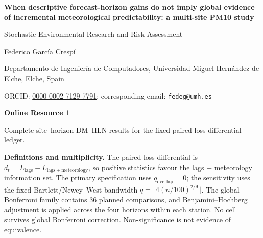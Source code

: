 \documentclass[10pt]{article}
\begin{document}
\begin{center}
{\Large\bfseries When descriptive forecast-horizon gains do not imply global evidence\\[2pt]
of incremental meteorological predictability: a multi-site PM10 study\par}
\vspace{4pt}
{\normalsize Stochastic Environmental Research and Risk Assessment\par}
{\normalsize Federico García Crespí\par}
{\small Departamento de Ingeniería de Computadores, Universidad Miguel Hernández de Elche, Elche, Spain\par}
{\small ORCID: \href{https://orcid.org/0000-0002-7129-7791}{0000-0002-7129-7791}; corresponding email: \texttt{fedeg@umh.es}\par}
\vspace{8pt}
{\Large\bfseries Online Resource 1\par}
\vspace{3pt}
Complete site--horizon DM--HLN results for the fixed paired loss-differential ledger.
\end{center}
\noindent\textbf{Definitions and multiplicity.} The paired loss differential is
$d_t=L_{\mathrm{lags}}-L_{\mathrm{lags+meteorology}}$, so positive statistics favour the lags + meteorology information set.
The primary specification uses $q_{\mathrm{overlap}}=0$; the sensitivity uses the fixed Bartlett/Newey--West bandwidth
$q=\lfloor4(n/100)^{2/9}\rfloor$. The global Bonferroni family contains 36 planned comparisons, and
Benjamini--Hochberg adjustment is applied across the four horizons within each station. No cell survives global
Bonferroni correction. Non-significance is not evidence of equivalence.
\vspace{6pt}
\tiny
\renewcommand{\tablename}{Online Resource}
\end{document}

